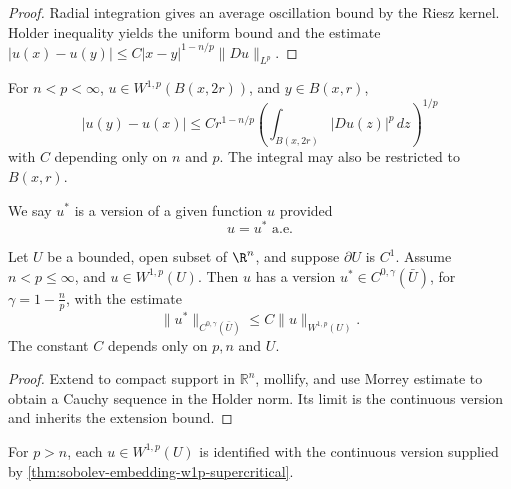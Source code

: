 \begin{proof}
\sketch Radial integration gives an average oscillation bound by the Riesz kernel. Holder inequality yields the uniform bound and the estimate $|u(x)-u(y)|\le C|x-y|^{1-n/p}\|Du\|_{L^p}$.
\end{proof}

\begin{remark}
\label{rem:morrey-estimate-on-ball}
For $n<p<\infty$, $u\in W^{1,p}(B(x,2r))$, and $y\in B(x,r)$,
$$|u(y) - u(x)| \le Cr^{1-n/p} \left( \int_{B(x,2r)} |Du(z)|^p\,dz \right)^{1/p}$$
with $C$ depending only on $n$ and $p$. The integral may also be restricted to $B(x,r)$.
\end{remark}

\begin{definition}
\label{def:version-of-a-function}
We say $u^*$ is a version of a given function $u$ provided
$$u = u^* \text{ a.e.}$$
\end{definition}

\begin{theorem}
\label{thm:sobolev-embedding-w1p-supercritical}
Let $U$ be a bounded, open subset of $\R^n$, and suppose $\partial U$ is $C^1$. Assume $n < p \le \infty$, and $u \in W^{1,p}(U)$. Then $u$ has a version $u^* \in C^{0,\gamma}(\bar{U})$, for $\gamma = 1 - \frac{n}{p}$, with the estimate
$$\|u^*\|_{C^{0,\gamma}(\bar{U})} \le C\|u\|_{W^{1,p}(U)}.$$
The constant $C$ depends only on $p, n$ and $U$.
\end{theorem}

\begin{proof}
\sketch Extend to compact support in $\mathbb R^n$, mollify, and use Morrey estimate to obtain a Cauchy sequence in the Holder norm. Its limit is the continuous version and inherits the extension bound.
\end{proof}

\begin{remark}
\label{rem:identify-continuous-version}
For $p>n$, each $u\in W^{1,p}(U)$ is identified with the continuous version supplied by \cref{thm:sobolev-embedding-w1p-supercritical}.
\end{remark}

